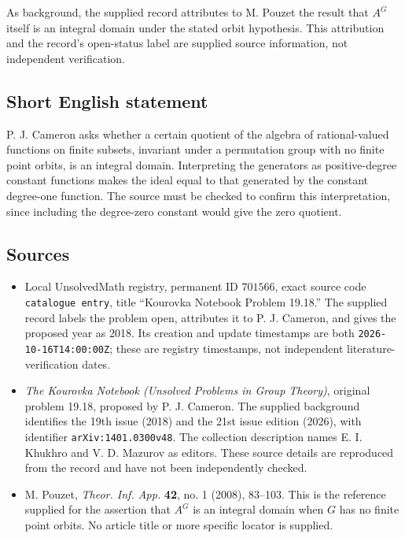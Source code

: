 \documentclass[11pt]{article}
\begin{document}
As background, the supplied record attributes to M. Pouzet the result that \(A^G\) itself is an integral domain under the stated orbit hypothesis. This attribution and the record's open-status label are supplied source information, not independent verification.
\subsection{Short English statement}
P. J. Cameron asks whether a certain quotient of the algebra of rational-valued functions on finite subsets, invariant under a permutation group with no finite point orbits, is an integral domain. Interpreting the generators as positive-degree constant functions makes the ideal equal to that generated by the constant degree-one function. The source must be checked to confirm this interpretation, since including the degree-zero constant would give the zero quotient.
\subsection{Sources}
\begin{itemize}
\item Local UnsolvedMath registry, permanent ID \(701566\), exact source code \texttt{catalogue entry}, title ``Kourovka Notebook Problem 19.18.'' The supplied record labels the problem open, attributes it to P. J. Cameron, and gives the proposed year as 2018. Its creation and update timestamps are both \texttt{2026-10-16T14:00:00Z}; these are registry timestamps, not independent literature-verification dates.
\item \emph{The Kourovka Notebook (Unsolved Problems in Group Theory)}, original problem 19.18, proposed by P. J. Cameron. The supplied background identifies the 19th issue (2018) and the 21st issue edition (2026), with identifier \texttt{arXiv:1401.0300v48}. The collection description names E. I. Khukhro and V. D. Mazurov as editors. These source details are reproduced from the record and have not been independently checked.
\item M. Pouzet, \emph{Theor. Inf. App.} \textbf{42}, no. 1 (2008), 83--103. This is the reference supplied for the assertion that \(A^G\) is an integral domain when \(G\) has no finite point orbits. No article title or more specific locator is supplied.
\end{itemize}
\end{document}

